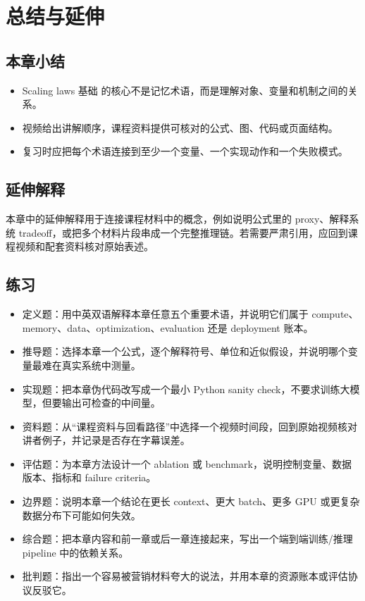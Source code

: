 \documentclass[a4paper]{article}
\begin{document}
\section{总结与延伸}
\subsection{本章小结}
\begin{itemize}
\item Scaling laws 基础 的核心不是记忆术语，而是理解对象、变量和机制之间的关系。
\item 视频给出讲解顺序，课程资料提供可核对的公式、图、代码或页面结构。
\item 复习时应把每个术语连接到至少一个变量、一个实现动作和一个失败模式。
\end{itemize}
\subsection{延伸解释}
本章中的延伸解释用于连接课程材料中的概念，例如说明公式里的 proxy、解释系统 tradeoff，或把多个材料片段串成一个完整推理链。若需要严肃引用，应回到课程视频和配套资料核对原始表述。
\subsection{练习}
\begin{itemize}
\item 定义题：用中英双语解释本章任意五个重要术语，并说明它们属于 compute、memory、data、optimization、evaluation 还是 deployment 账本。
\item 推导题：选择本章一个公式，逐个解释符号、单位和近似假设，并说明哪个变量最难在真实系统中测量。
\item 实现题：把本章伪代码改写成一个最小 Python sanity check，不要求训练大模型，但要输出可检查的中间量。
\item 资料题：从“课程资料与回看路径”中选择一个视频时间段，回到原始视频核对讲者例子，并记录是否存在字幕误差。
\item 评估题：为本章方法设计一个 ablation 或 benchmark，说明控制变量、数据版本、指标和 failure criteria。
\item 边界题：说明本章一个结论在更长 context、更大 batch、更多 GPU 或更复杂数据分布下可能如何失效。
\item 综合题：把本章内容和前一章或后一章连接起来，写出一个端到端训练/推理 pipeline 中的依赖关系。
\item 批判题：指出一个容易被营销材料夸大的说法，并用本章的资源账本或评估协议反驳它。
\end{itemize}
\end{document}
